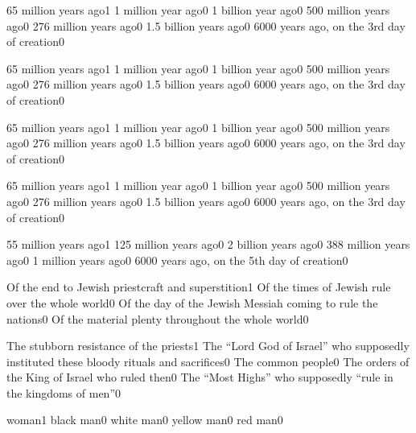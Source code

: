 {65 million years ago}{1}
{1 million year ago}{0}
{1 billion year ago}{0}
{500 million years ago}{0}
{276 million years ago}{0}
{1.5 billion years ago}{0}
{6000 years ago, on the 3rd day of creation}{0}
\qstop

{65 million years ago}{1}
{1 million year ago}{0}
{1 billion year ago}{0}
{500 million years ago}{0}
{276 million years ago}{0}
{1.5 billion years ago}{0}
{6000 years ago, on the 3rd day of creation}{0}
\qstop

{65 million years ago}{1}
{1 million year ago}{0}
{1 billion year ago}{0}
{500 million years ago}{0}
{276 million years ago}{0}
{1.5 billion years ago}{0}
{6000 years ago, on the 3rd day of creation}{0}
\qstop

{65 million years ago}{1}
{1 million year ago}{0}
{1 billion year ago}{0}
{500 million years ago}{0}
{276 million years ago}{0}
{1.5 billion years ago}{0}
{6000 years ago, on the 3rd day of creation}{0}
\qstop

{55 million years ago}{1}
{125 million years ago}{0}
{2 billion years ago}{0}
{388 million years ago}{0}
{1 million years ago}{0}
{6000 years ago, on the 5th day of creation}{0}
\qstop

{Of the end to Jewish priestcraft and superstition}{1}
{Of the times of Jewish rule over the whole world}{0}
{Of the day of the Jewish Messiah coming to rule the nations}{0}
{Of the material plenty throughout the whole world}{0}
\qstop

{The stubborn resistance of the priests}{1}
{The ``Lord God of Israel'' who supposedly instituted these bloody rituals and sacrifices}{0}
{The common people}{0}
{The orders of the King of Israel who ruled then}{0}
{The ``Most Highs'' who supposedly ``rule in the kingdoms of men''}{0}
\qstop

{woman}{1}
{black man}{0}
{white man}{0}
{yellow man}{0}
{red man}{0}
\qstop

